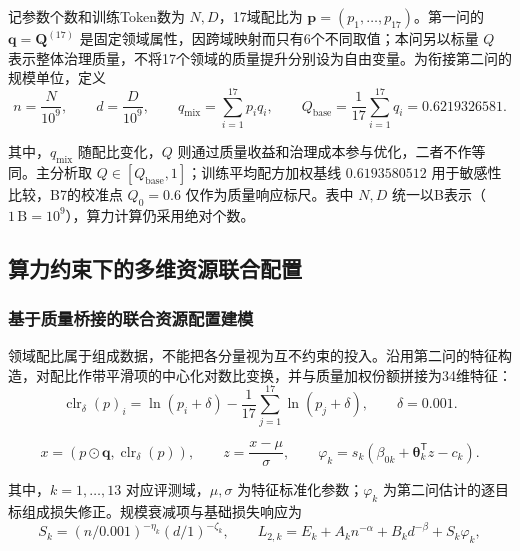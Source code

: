 \documentclass[bwprint]{gmcmthesis}
\begin{document}
记参数个数和训练Token数为 $N,D$，17域配比为 $\mathbf p=(p_1,\ldots,p_{17})$。第一问的 $\mathbf q=\mathbf Q^{(17)}$ 是固定领域属性，因跨域映射而只有6个不同取值；本问另以标量 $Q$ 表示整体治理质量，不将17个领域的质量提升分别设为自由变量。为衔接第二问的规模单位，定义
\begin{equation}\label{eq:q3_1}
    n=\frac{N}{10^9},\qquad d=\frac{D}{10^9},\qquad
    q_{\mathrm{mix}}=\sum_{i=1}^{17}p_iq_i,\qquad
    Q_{\mathrm{base}}=\frac{1}{17}\sum_{i=1}^{17}q_i=0.6219326581.
\end{equation}

其中，$q_{\mathrm{mix}}$ 随配比变化，$Q$ 则通过质量收益和治理成本参与优化，二者不作等同。主分析取 $Q\in[Q_{\mathrm{base}},1]$；训练平均配方加权基线 $0.6193580512$ 用于敏感性比较，B7的校准点 $Q_0=0.6$ 仅作为质量响应标尺。表中 $N,D$ 统一以B表示（$1\,\mathrm B=10^9$），算力计算仍采用绝对个数。

\subsection{算力约束下的多维资源联合配置}

\subsubsection{基于质量桥接的联合资源配置建模}

领域配比属于组成数据，不能把各分量视为互不约束的投入。沿用第二问的特征构造，对配比作带平滑项的中心化对数比变换，并与质量加权份额拼接为34维特征：
\begin{equation}\label{eq:q3_2}
    \operatorname{clr}_{\delta}(p)_i=\ln(p_i+\delta)-\frac{1}{17}\sum_{j=1}^{17}\ln(p_j+\delta),
    \qquad \delta=0.001.
\end{equation}

\begin{equation}\label{eq:q3_3}
    x=(p\odot\mathbf q,\operatorname{clr}_{\delta}(p)),\qquad
    z=\frac{x-\mu}{\sigma},\qquad
    \varphi_k=s_k(\beta_{0k}+\boldsymbol\theta_k^{\mathsf T}z-c_k).
\end{equation}

其中，$k=1,\ldots,13$ 对应评测域，$\mu,\sigma$ 为特征标准化参数；$\varphi_k$ 为第二问估计的逐目标组成损失修正。规模衰减项与基础损失响应为
\begin{equation}\label{eq:q3_4}
    S_k=(n/0.001)^{-\eta_k}(d/1)^{-\zeta_k},\qquad
    L_{2,k}=E_k+A_kn^{-\alpha}+B_kd^{-\beta}+S_k\varphi_k,
\end{equation}
\end{document}
